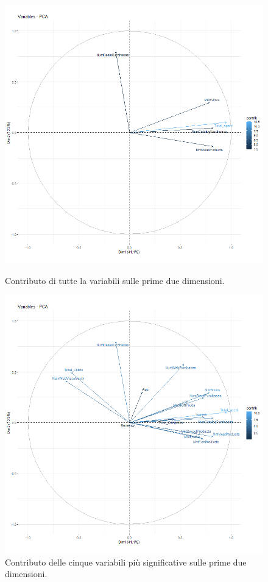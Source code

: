 \documentclass[letterpaper,11pt]{article}
\begin{document}
\begin{figure}[H]
   \begin{minipage}{0.48\textwidth}
     \centering
     \includegraphics[width=1\linewidth]{Img/PCA/PCA005.png}
     \caption{Contributo di tutte la variabili sulle prime due dimensioni.}\label{fig:fvizpcavar1}
   \end{minipage}\hfill
   \begin{minipage}{0.48\textwidth}
     \centering
     \includegraphics[width=1\linewidth]{Img/PCA/PCA004.png}
     \caption{Contributo delle cinque variabili più significative sulle prime due dimensioni.}\label{fig:fvizpcavar2}
   \end{minipage}
\end{figure}
\end{document}
